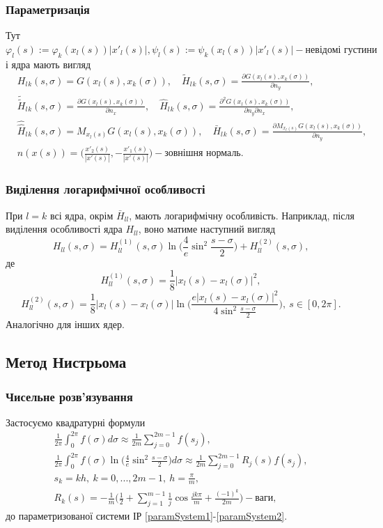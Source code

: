 \documentclass[10pt]{beamer}
\begin{document}
\begin{frame}
\frametitle{Параметризація}
Тут $ \label{kernels} \varphi_l(s) :=\varphi_k(x_l(s))|x'_l(s)|,  \psi_l(s) :=\psi_k(x_l(s))|x'_l(s)| - \textrm{невідомі густини} $ і ядра мають вигляд
 \begin{equation}
 \begin{split}
	&H_l{_k}(s, \sigma) = G(x_l(s),x_k(\sigma)), \quad \tilde{H}_l{_k}(s, \sigma)=\frac{\partial G(x_l(s),x_k(\sigma))}{\partial n_y}, \\
	&\tilde{\tilde{H}}_l{_k}(s, \sigma)=\frac{\partial G(x_l(s),x_k(\sigma))}{\partial n_x}, \quad \hat{H}_l{_k}(s, \sigma)=\frac{\partial^2 G(x_l(s),x_k(\sigma))}{\partial n_y\partial n_x}, \\
	&\hat{\hat{H}}_l{_k}(s, \sigma) = M_{x_l(s)}G(x_l(s),x_k(\sigma)), \quad \bar{H}_l{_k}(s, \sigma)=\frac{\partial M_{x_l(s)}G(x_l(s),x_k(\sigma))}{\partial n_y}, \\
	&n(x(s))=\Big(\frac{x'_2(s)}{|x'(s)|},-\frac{x'_1(s)}{|x'(s)|}\Big) - \textrm{зовнішня нормаль.} \nonumber
 \end{split}
 \end{equation}
\end{frame}

\begin{frame}
\frametitle{Виділення логарифмічної особливості}

При $l=k$ всі ядра, окрім $\bar{H}_{ll}$, мають логарифмічну особливість. Наприклад, після виділення особливості ядра $H_{ll}$, воно матиме наступний вигляд
$$
H_{ll}(s, \sigma)=H^{(1)}_{ll}(s, \sigma)\ln\bigg(\frac{4}{e}\sin^2\frac{s-\sigma}{2}\bigg)+H^{(2)}_{ll}(s, \sigma),
$$
де
$$
H^{(1)}_{ll}(s, \sigma)=\frac{1}{8}|x_l(s)-x_l(\sigma)|^2,
$$
$$
H^{(2)}_{ll}(s, \sigma)=\frac{1}{8}|x_l(s)-x_l(\sigma)|\ln\Big(\frac{e|x_l(s)-x_l(\sigma)|^2}{4\sin^2\frac{s-\sigma}{2}}\Big), \ s\in [0,2\pi].
$$
Аналогічно для інших ядер.

\end{frame}
 
 \subsection{Метод Нистрьома}
 \begin{frame}
\frametitle{Чисельне розв'язування}
Застосуємо квадратурні формули 
 \begin{gather}
 	\frac{1}{2\pi}\int_{0}^{2\pi}f(\sigma)d\sigma\approx\frac{1}{2m}\sum_{j=0}^{2m-1}f(s_j), \\
	\frac{1}{2\pi}\int_{0}^{2\pi}f(\sigma)\ln\bigg(\frac{4}{e}\sin^2\frac{s-\sigma}{2}\bigg)d\sigma\approx\frac{1}{2m}\sum_{j=0}^{2m-1}R_j(s)f(s_j), \\
	s_k=kh, \ k=0,...,2m-1, \ h=\frac{\pi}{m}, \nonumber \\
	R_k(s)=-\frac{1}{m}\bigg(\frac{1}{2}+\sum_{j=1}^{m-1}\frac{1}{j}\cos \frac{jk\pi}{m}+ \frac{(-1)^k}{2m}\bigg) - \textrm{ваги} \nonumber ,
 \end{gather}
  до параметризованої системи ІР \eqref{paramSystem1}-\eqref{paramSystem2}.
\end{frame}
\end{document}
